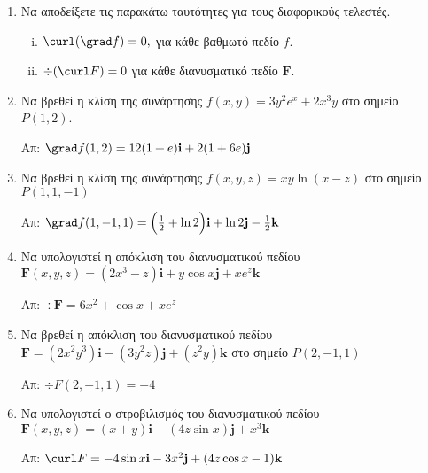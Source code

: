 


\pagestyle{askhseis}
\everymath{\displaystyle}
\renewcommand{\vec}{\mathbf}



\begin{center}
  \minibox{\large\bf \textcolor{Col1}{Ασκήσεις Κλίση, Απόκλιση, Στροβιλισμός}}
\end{center}

\vspace{\baselineskip}

\begin{enumerate}

\item Να αποδείξετε τις παρακάτω ταυτότητες για τους διαφορικούς τελεστές.

\begin{enumerate}[i)]
\item $\curl(\grad f)=0, $ για κάθε βαθμωτό πεδίο $f$.
\item $\div(\curl F)=0$ για κάθε διανυσματικό πεδίο $ \mathbf{F} $.
\end{enumerate}

\item Να βρεθεί η κλίση της συνάρτησης $ f(x,y)=3y^2e^x+2x^3y $ στο σημείο $P(1,2)$.

\hfill Απ: $\grad f(1,2)=12(1+e)\vec{i}+2(1+6e)\vec{j}$

\item Να βρεθεί η κλίση της συνάρτησης $ f(x,y, z)=xy\ln(x-z) $ στο σημείο $P(1,1,-1)$

\hfill Απ: $\grad f(1,-1,1)=\Bigl(\frac{1}{2}+\ln2\Bigr)\vec{i}+\ln 2\vec{j}- 
\frac{1}{2}\vec{k} $


\item Να υπολογιστεί η απόκλιση του διανυσματικού πεδίου
$ \boldsymbol{F}(x,y,z)=(2x^3-z)\vec{i}+y\cos x\vec{j}+xe^z\vec{k} $

\hfill Απ: $\div\boldsymbol{F}=6x^2+\cos x+xe^z$

\item Να βρεθεί η απόκλιση του διανυσματικού πεδίου 
  $ \boldsymbol{F}=(2x^2y^3)\vec{i}-(3y^2z)\vec{j}+(z^2y)\vec{k} $ στο σημείο $P(2,-1,1)$

\hfill Απ: $\div F(2,-1,1)=-4$

\item Να υπολογιστεί ο στροβιλισμός του διανυσματικού πεδίου
$ \boldsymbol{F}(x,y,z)=(x+y)\vec{i}+(4z\sin x)\vec{j}+x^3\vec{k} $

\hfill Απ: $\curl F=-4\sin x\vec{i}-3x^2\vec{j}+(4z\cos x-1)\vec{k}$


\end{enumerate}
